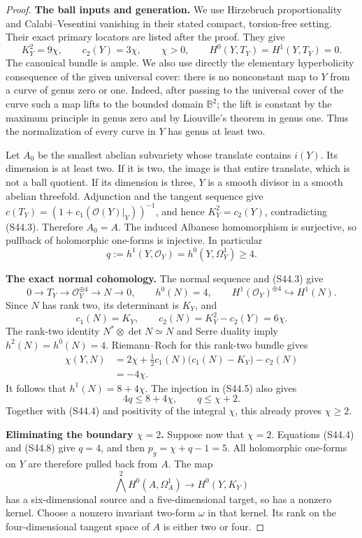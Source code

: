 \begin{proof}
\noindent\textbf{The ball inputs and generation.}
We use Hirzebruch proportionality and Calabi--Vesentini vanishing in
their stated compact, torsion-free setting. Their exact primary
locators are listed after the proof. They give
\[
 K_Y^2=9\chi,\qquad c_2(Y)=3\chi,\qquad \chi>0,
 \qquad H^0(Y,T_Y)=H^1(Y,T_Y)=0.
 \tag{S44.3}
\]
The canonical bundle is ample. We also use directly the elementary
hyperbolicity consequence of the given universal cover: there is no
nonconstant map to $Y$ from a curve of genus zero or one. Indeed, after
passing to the universal cover of the curve such a map lifts to the
bounded domain $\mathbb B^2$; the lift is constant by the maximum
principle in genus zero and by Liouville's theorem in genus one.
Thus the normalization of every curve in $Y$ has genus at least two.

Let $A_0$ be the smallest abelian subvariety whose translate contains
$i(Y)$. Its dimension is at least two. If it is two, the image is that
entire translate, which is not a ball quotient. If its dimension is
three, $Y$ is a smooth divisor in a smooth abelian threefold.
Adjunction and the tangent sequence give
$c(T_Y)=(1+c_1(\mathcal O(Y)|_Y))^{-1}$, and hence
$K_Y^2=c_2(Y)$, contradicting (S44.3). Therefore $A_0=A$.
The induced Albanese homomorphism is surjective, so pullback of
holomorphic one-forms is injective. In particular
\[
 q:=h^1(Y,\mathcal O_Y)=h^0(Y,\Omega_Y^1)\ge4.
 \tag{S44.4}
\]

\noindent\textbf{The exact normal cohomology.}
The normal sequence and (S44.3) give
\[
 0\longrightarrow T_Y\longrightarrow\mathcal O_Y^{\oplus4}
   \longrightarrow N\longrightarrow0,
 \qquad h^0(N)=4,
 \qquad H^1(\mathcal O_Y)^{\oplus4}\hookrightarrow H^1(N).
 \tag{S44.5}
\]
Since $N$ has rank two, its determinant is $K_Y$, and
\[
 c_1(N)=K_Y,\qquad
 c_2(N)=K_Y^2-c_2(Y)=6\chi.
 \tag{S44.6}
\]
The rank-two identity $N^*\otimes\det N\simeq N$ and Serre duality
imply $h^2(N)=h^0(N)=4$. Riemann--Roch for this rank-two bundle gives
\[
 \begin{aligned}
 \chi(Y,N)
 &=2\chi+\tfrac12 c_1(N)\bigl(c_1(N)-K_Y\bigr)-c_2(N)\\
 &=-4\chi.
 \end{aligned}
 \tag{S44.7}
\]
It follows that $h^1(N)=8+4\chi$. The injection in (S44.5) also gives
\[
 4q\le8+4\chi,\qquad q\le\chi+2.
 \tag{S44.8}
\]
Together with (S44.4) and positivity of the integral $\chi$, this
already proves $\chi\ge2$.

\noindent\textbf{Eliminating the boundary $\chi=2$.}
Suppose now that $\chi=2$. Equations (S44.4) and (S44.8) give $q=4$,
and then $p_g=\chi+q-1=5$. All holomorphic one-forms on $Y$ are
therefore pulled back from $A$. The map
\[
 \bigwedge^2H^0(A,\Omega_A^1)\longrightarrow H^0(Y,K_Y)
 \tag{S44.9}
\]
has a six-dimensional source and a five-dimensional target, so has
a nonzero kernel. Choose a nonzero invariant two-form $\omega$ in
that kernel. Its rank on the four-dimensional tangent space of $A$
is either two or four.


\end{proof}
